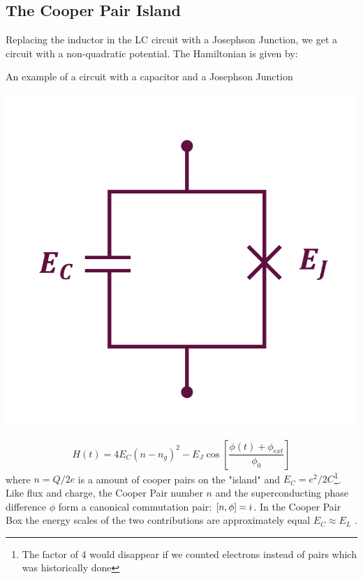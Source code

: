 \subsection{The Cooper Pair Island}
Replacing the inductor in the LC circuit with a Josephson Junction, we get a circuit with a non-quadratic potential. The Hamiltonian is given by:
\begin{marginfigure}
    \caption{An example of a circuit with a capacitor and a Josephson Junction}
    \includegraphics[width = \textwidth]{tex/fig_for_text/CooperPairIsland.png}
    \label{fig:cooper_pair_island}
\end{marginfigure}

\begin{equation}
    H(t) =  4 E_C (n - n_g)^2 -  E_J \cos \left[ \frac{\phi(t) + \phi_{ext}}{\phi_0} \right]
\end{equation}
where $n = Q/2e$ is a amount of cooper pairs on the "island" and $E_C = e^2/2C$\footnote{The factor of 4 would disappear if we counted electrons instead of pairs which was historically done}. Like flux and charge, the Cooper Pair number $n$ and the superconducting phase difference $\phi$ form a canonical commutation pair: $\comm{n}{\phi} = i$. In the Cooper Pair Box the energy scales of the two contributions are approximately equal $E_C \approx E_L$ \cite{blais_circuit_2021}. 


